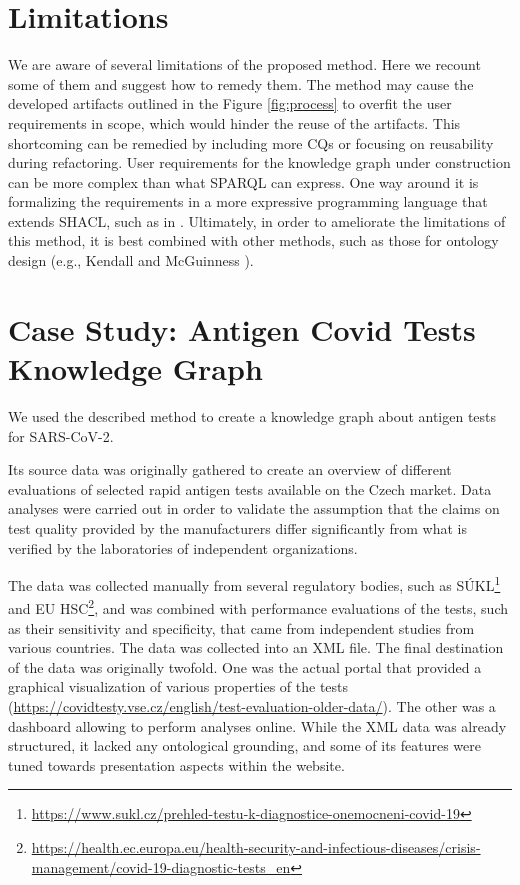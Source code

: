 \documentclass[
]{ceurart}
\begin{document}
\section{Limitations}
We are aware of several limitations of the proposed method. Here we recount some of them and suggest how to remedy them. The method may cause the developed artifacts outlined in the Figure \ref{fig:process} to overfit the user requirements in scope, which would hinder the reuse of the artifacts. This shortcoming can be remedied by including more CQs or focusing on reusability during refactoring. User requirements for the knowledge graph under construction can be more complex than what SPARQL can express. One way around it is formalizing the requirements in a more expressive programming language that extends SHACL, such as in \cite{SHACLJS2017}. Ultimately, in order to ameliorate the limitations of this method, it is best combined with other methods, such as those for ontology design (e.g., Kendall and McGuinness \cite{Kendall2019}).

\section{Case Study: Antigen Covid Tests Knowledge Graph}

We used the described method to create a knowledge graph about antigen tests for SARS-CoV-2.

Its source data was originally gathered to create an overview of different evaluations of selected rapid antigen tests available on the Czech market.
Data analyses were carried out  \cite{Kliegr2022} in order to validate the assumption that the claims on test quality provided by the manufacturers differ significantly from what is verified by the laboratories of independent organizations.

The data was collected manually from several regulatory bodies, such as SÚKL\footnote{\url{https://www.sukl.cz/prehled-testu-k-diagnostice-onemocneni-covid-19}} and EU HSC\footnote{\url{https://health.ec.europa.eu/health-security-and-infectious-diseases/crisis-management/covid-19-diagnostic-tests_en}}, and was combined with performance evaluations of the tests, such as their sensitivity and specificity, that came from independent studies from various countries.
The data was collected into an XML file.
The final destination of the data was originally twofold.
One was the actual portal that provided a graphical visualization of various properties of the tests (\url{https://covidtesty.vse.cz/english/test-evaluation-older-data/}).
The other was a dashboard allowing to perform analyses online.
While the XML data was already structured, it lacked any ontological grounding, and some of its features were tuned towards presentation aspects within the website.
\end{document}
